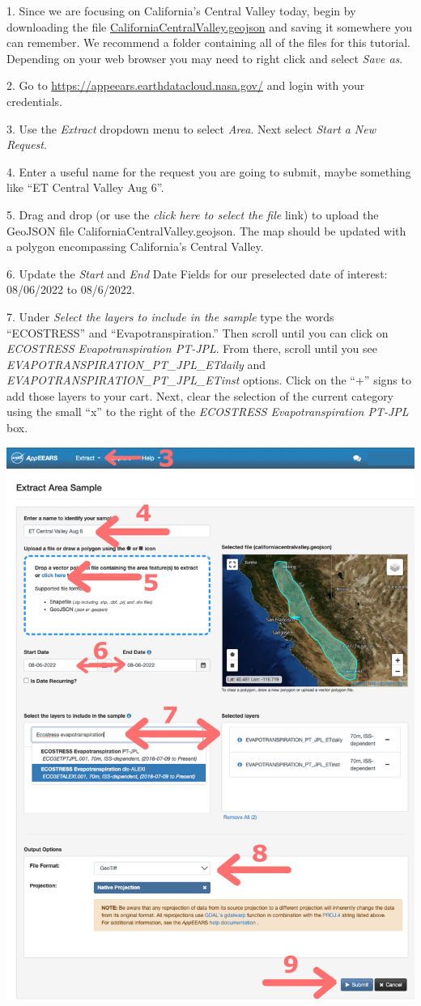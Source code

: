 \documentclass[oneside,a4paper,11pt,explicit]{book}
\begin{document}
1. Since we are focusing on California's Central Valley today, begin by downloading the file \href{https://jeremydforsythe.github.io/icecream-tutorials/Tutorial6_Evaportranspiration1/CaliforniaCentralValley.geojson}{CaliforniaCentralValley.geojson} and saving it somewhere you can remember. We recommend a folder containing all of the files for this tutorial. Depending on your web browser you may need to right click and select \textit{Save as}.


2. Go to \href{https://appeears.earthdatacloud.nasa.gov/}{https://appeears.earthdatacloud.nasa.gov/} and login with your credentials. 

3. Use the \textit{Extract} dropdown menu to select \textit{Area}. Next select \textit{Start a New Request}. 

4. Enter a useful name for the request you are going to submit, maybe something like ``ET Central Valley Aug 6''. 

5. Drag and drop (or use the \textit{click here to select the file} link) to upload the GeoJSON file CaliforniaCentralValley.geojson. The map should be updated with a polygon encompassing California's Central Valley.

6. Update the \textit{Start} and \textit{End} Date Fields for our preselected date of interest: 08/06/2022 to 08/6/2022.

7. Under \textit{Select the layers to include in the sample} type the words ``ECOSTRESS'' and ``Evapotranspiration.'' Then scroll until you can click on \textit{ECOSTRESS Evapotranspiration PT-JPL}. From there, scroll until you see \textit{EVAPOTRANSPIRATION\_PT\_JPL\_ETdaily} and \textit{EVAPOTRANSPIRATION\_PT\_JPL\_ETinst} options. Click on the ``+'' signs to add those layers to your cart. Next, clear the selection of the current category using the small ``x'' to the right of the \textit{ECOSTRESS Evapotranspiration PT-JPL} box.

\centerline{\includegraphics[width=.6\textwidth]{ETRequest.png}}
\end{document}
